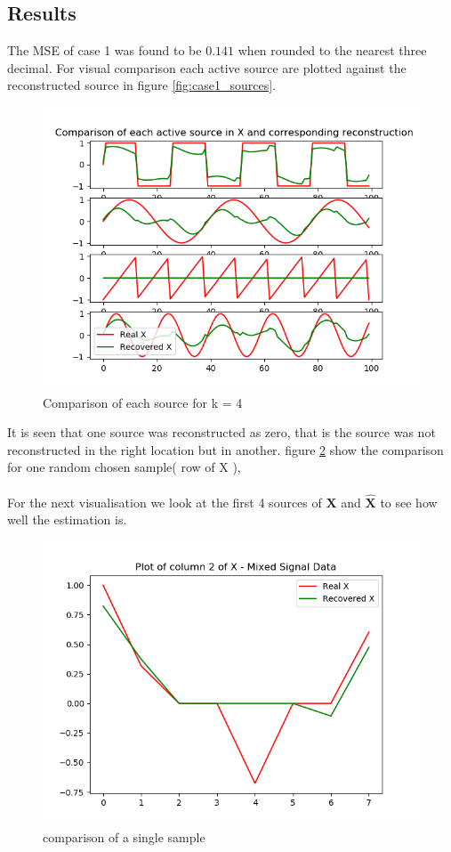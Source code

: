 \subsection*{Results}
The MSE of case 1 was found to be $0.141$ when rounded to the nearest three decimal.
For visual comparison each active source are plotted against the reconstructed source in figure \ref{fig:case1_sources}. 
\begin{figure}[H]
\centering
\includegraphics[width=\textwidth]{figures/cases/case1_1.png}
\caption{Comparison of each source for k = 4 }
\label{fig:case1_soures}
\end{figure}
\noindent
It is seen that one source was reconstructed as zero, that is the source was not reconstructed in the right location but in another. 
figure \ref{fig:case1_sample} show the comparison for one random chosen sample( row of X ),
\\ \\
For the next visualisation we look at the first 4 sources of $\mathbf{X}$ and $\hat{\mathbf{X}}$ to see how well the estimation is.
\begin{figure}[H]
\centering
\includegraphics[width=\textwidth]{figures/cases/case1_2.png}
\caption{comparison of a single sample}
\label{fig:case1_sample}
\end{figure}
\noindent

